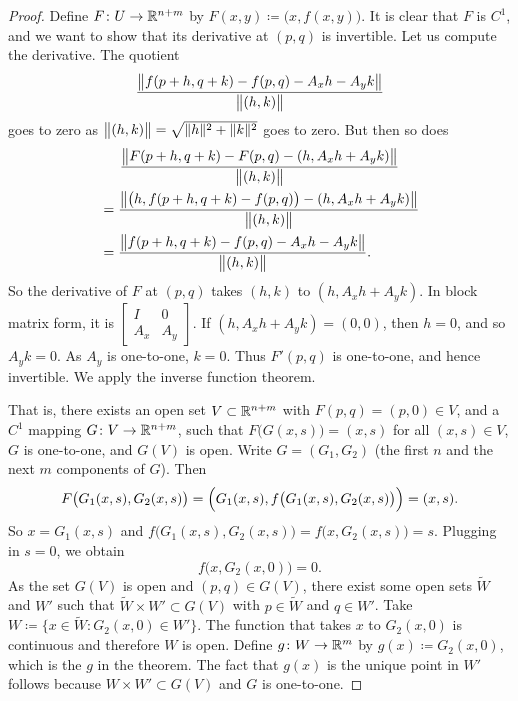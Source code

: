\begin{proof}
Define $F \colon U \to {\mathbb{R}}^{n+m}$ by $F(x,y) \coloneqq \bigl(x,f(x,y)\bigr)$.
It is clear that $F$ is $C^1$, and we want to show that its derivative
at $(p,q)$ is invertible.
Let us compute the derivative.  The quotient
\begin{equation*}
\frac{\bigl\lVert {f(p+h,q+k) - f(p,q) - A_x h - A_y k} \bigr\rVert}{\bigl\lVert {(h,k)} \bigr\rVert}
\end{equation*}
goes to zero as $\bigl\lVert {(h,k)} \bigr\rVert = \sqrt{\lVert {h} \rVert^2+\lVert {k} \rVert^2}$ goes to zero.
But then so does
\begin{multline*}
\frac{\bigl\lVert {F(p+h,q+k)-F(p,q) - (h,A_x h+A_y k)} \bigr\rVert}{\bigl\lVert {(h,k)} \bigr\rVert}
\\
\begin{aligned}
& =
\frac{\bigl\lVert {\bigl(h,f(p+h,q+k)-f(p,q)\bigr) - (h,A_x h+A_y
k)} \bigr\rVert}{\bigl\lVert {(h,k)} \bigr\rVert}
\\
& =
\frac{\bigl\lVert {f(p+h,q+k) - f(p,q) - A_x h - A_y k} \bigr\rVert}{\bigl\lVert {(h,k)} \bigr\rVert} .
\end{aligned}
\end{multline*}
So the derivative of $F$ at $(p,q)$ takes $(h,k)$ to $(h,A_x h+A_y k)$.
In block matrix form, it is
$\left[\begin{smallmatrix}I & 0\\A_x & A_y\end{smallmatrix}\right]$.  If 
$(h,A_x h+A_y k) = (0,0)$, then $h=0$, and so $A_y k = 0$.  As $A_y$ is
one-to-one, $k=0$.  Thus $F'(p,q)$ is one-to-one, and hence invertible.
We apply the inverse function theorem.

That is, there exists an open set $V \subset {\mathbb{R}}^{n+m}$ with
$F(p,q) = (p,0) \in V$,
and a  $C^1$
mapping $G \colon V \to {\mathbb{R}}^{n+m}$, such that $F\bigl(G(x,s)\bigr) = (x,s)$ for
all $(x,s) \in V$, $G$ is one-to-one, and $G(V)$ is open. %
Write $G = (G_1,G_2)$ (the first $n$ and the next $m$ components of $G$).
Then
\begin{equation*}
F\bigl(G_1(x,s),G_2(x,s)\bigr) = \Bigl(G_1(x,s),f\bigl(G_1(x,s),G_2(x,s) \bigr)\Bigr)
= (x,s) .
\end{equation*}
So $x = G_1(x,s)$ and $f\bigl(G_1(x,s),G_2(x,s)\bigr) = f\bigl(x,G_2(x,s)\bigr) = s$.
Plugging in $s=0$, we obtain
\begin{equation*}
f\bigl(x,G_2(x,0)\bigr) = 0 .
\end{equation*}
As the set $G(V)$ is open and $(p,q) \in G(V)$,
there exist some open sets
$\widetilde{W}$ and $W'$ such that $\widetilde{W} \times W' \subset G(V)$ with $p
\in \widetilde{W}$ and
$q \in W'$.
Take $W \coloneqq \bigl\{ x \in \widetilde{W} : G_2(x,0) \in W' \bigr\}$.
The function that takes $x$ to $G_2(x,0)$ is continuous and therefore $W$
is open.
Define
$g \colon W \to {\mathbb{R}}^m$ by $g(x) \coloneqq G_2(x,0)$, which is the $g$ in the theorem.
The fact that $g(x)$ is the unique point in $W'$ follows because $W \times
W' \subset G(V)$ and $G$ is one-to-one.


\end{proof}
